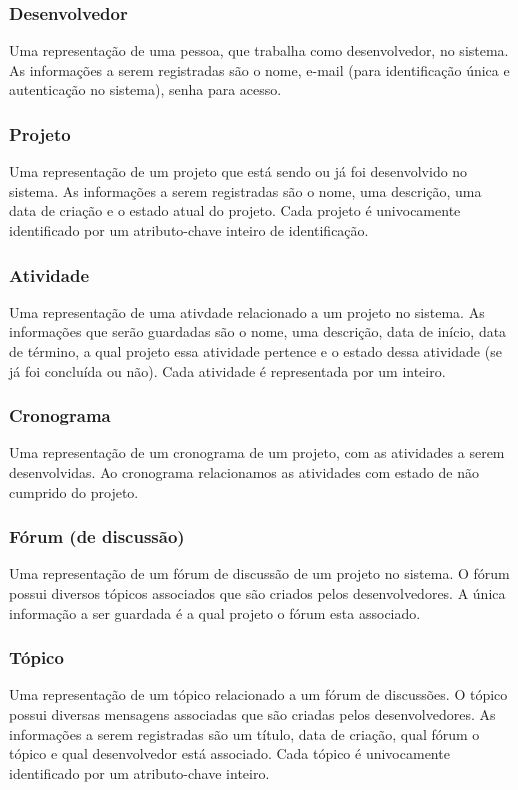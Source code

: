 \documentclass{article}
\begin{document}
		\subsubsection{Desenvolvedor}
		Uma representação de uma pessoa, que trabalha como desenvolvedor, no sistema. As informações a serem registradas são o nome, e-mail (para identificação única e autenticação no sistema), senha para acesso.

		\subsubsection{Projeto}
		Uma representação de um projeto que está sendo ou já foi desenvolvido no sistema. As informações a serem registradas são o nome, uma descrição, uma data de criação e o estado atual do projeto. Cada projeto é univocamente identificado por um atributo-chave inteiro de identificação.

		\subsubsection{Atividade}
		Uma representação de uma ativdade relacionado a um projeto no sistema. As informações que serão guardadas são o nome, uma descrição, data de início, data de término, a qual projeto essa atividade pertence e o estado dessa atividade (se já foi concluída ou não). Cada atividade é representada por um inteiro.

		\subsubsection{Cronograma}
		Uma representação de um cronograma de um projeto, com as atividades a serem desenvolvidas. Ao cronograma relacionamos as atividades com estado de não cumprido do projeto.

		\subsubsection{Fórum (de discussão)}
		Uma representação de um fórum de discussão de um projeto no sistema. O fórum possui diversos tópicos associados que são criados pelos desenvolvedores. A única informação a ser guardada é a qual projeto o fórum esta associado.

		\subsubsection{Tópico}
		Uma representação de um tópico relacionado a um fórum de discussões. O tópico possui diversas mensagens associadas que são criadas pelos desenvolvedores. As informações a serem registradas são um título, data de criação, qual fórum o tópico e qual desenvolvedor está associado. Cada tópico é univocamente identificado por um atributo-chave inteiro.
\end{document}
